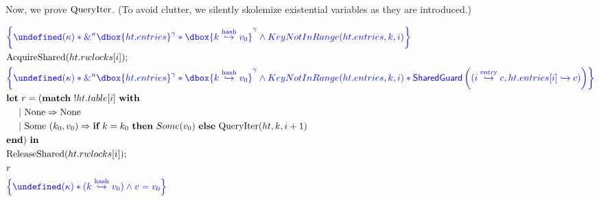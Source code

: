 \documentclass{article}
\newcommand\dboxed[1]{\dbox{\vphantom{t}\ensuremath{#1}}}
\newcommand{\borrow}[2]{\textsc{\&}^{#1}#2}
\newcommand{\pointsto}{\hookrightarrow}
\let\active\undefined
\DeclareMathOperator{\active}{active}
\begin{document}
\newpage

Now, we prove $\text{QueryIter}$. (To avoid clutter, we silently skolemize existential
variables as they are introduced.)

\begin{align*}
  &\inlinehoare{\active(\kappa) * \borrow{\kappa}{\dboxed{ht.entries}^\gamma}
      * \dboxed{k \hashto v_0}^\gamma \land KeyNotInRange(ht.entries, k, i)}\\
  &\AcquireShared(ht.rwlocks[i]);\\
  &\inlinehoare{\active(\kappa) * \borrow{\kappa}{\dboxed{ht.entries}^\gamma}
      * \dboxed{k \hashto v_0}^\gamma \land KeyNotInRange(ht.entries, k, i)
      * \SharedGuard\left( (i \entryto c, ht.entries[i] \pointsto c) \right) }\\
  &\langlet r = (\langmatch~ !ht.table[i] ~\langwith\\
  &~~~~ |~ \None \Rightarrow \None\\
  &~~~~ |~ \Some~(k_0,v_0) \Rightarrow
      \langif~ k = k_0 ~\langthen~ Some(v_0) ~\langelse~ \QueryIter(ht,k,i+1)\\
  &\langend) ~\langin\\
  &\ReleaseShared(ht.rwlocks[i]);\\
  &r\\
  &\inlinehoare{\active(\kappa) * (k \hashto v_0) \land v = v_0}
\end{align*}
\end{document}
